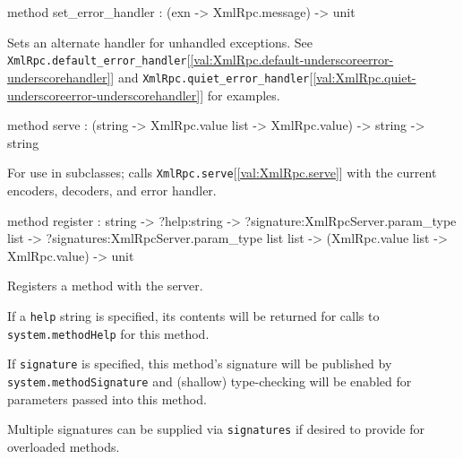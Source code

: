 \documentclass[11pt]{article}
\begin{document}
\begin{ocamldocobjectend}
\begin{ocamldocdescription}
\end{ocamldocdescription}


\label{method:XmlRpcServer.base.set-underscoreerror-underscorehandler}\begin{ocamldoccode}
method set_error_handler : (exn -> XmlRpc.message) -> unit
\end{ocamldoccode}
\begin{ocamldocdescription}
Sets an alternate handler for unhandled exceptions.
      See {\tt{XmlRpc.default\_error\_handler}}[\ref{val:XmlRpc.default-underscoreerror-underscorehandler}] and
      {\tt{XmlRpc.quiet\_error\_handler}}[\ref{val:XmlRpc.quiet-underscoreerror-underscorehandler}] for examples.


\end{ocamldocdescription}


\label{method:XmlRpcServer.base.serve}\begin{ocamldoccode}
method serve :
  (string -> XmlRpc.value list -> XmlRpc.value) -> string -> string
\end{ocamldoccode}
\begin{ocamldocdescription}
For use in subclasses; calls {\tt{XmlRpc.serve}}[\ref{val:XmlRpc.serve}] with the current
      encoders, decoders, and error handler.


\end{ocamldocdescription}


\label{method:XmlRpcServer.base.register}\begin{ocamldoccode}
method register :
  string ->
  ?help:string ->
  ?signature:XmlRpcServer.param_type list ->
  ?signatures:XmlRpcServer.param_type list list ->
  (XmlRpc.value list -> XmlRpc.value) -> unit
\end{ocamldoccode}
\begin{ocamldocdescription}
Registers a method with the server.


      If a {\tt{help}} string is specified, its contents will be returned for
      calls to {\tt{system.methodHelp}} for this method.


      If {\tt{signature}} is specified, this method's signature will be published
      by {\tt{system.methodSignature}} and (shallow) type-checking will be enabled
      for parameters passed into this method.


      Multiple signatures can be supplied via {\tt{signatures}} if desired to
      provide for overloaded methods.



\end{ocamldocdescription}
\end{ocamldocobjectend}
\end{document}
